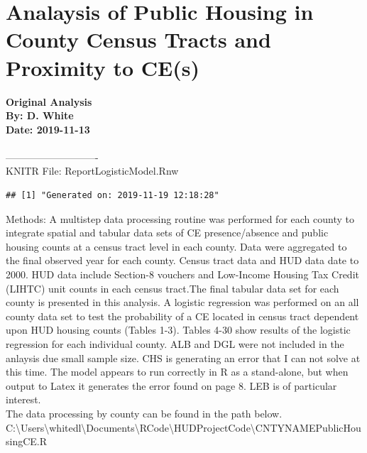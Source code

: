\documentclass{article}\usepackage[]{graphicx}\usepackage[]{color}
\makeatletter
\newenvironment{kframe}{%
 \def\at@end@of@kframe{}%
 \ifinner\ifhmode%
  \def\at@end@of@kframe{\end{minipage}}%
  \begin{minipage}{\columnwidth}%
 \fi\fi%
 \def\FrameCommand##1{\hskip\@totalleftmargin \hskip-\fboxsep
 \colorbox{shadecolor}{##1}\hskip-\fboxsep
     \hskip-\linewidth \hskip-\@totalleftmargin \hskip\columnwidth}%
 \MakeFramed {\advance\hsize-\width
   \@totalleftmargin\z@ \linewidth\hsize
   \@setminipage}}%
 {\par\unskip\endMakeFramed%
 \at@end@of@kframe}
\newenvironment{knitrout}{}{} %
\makeatother
\begin{document}
\section*{Analaysis of Public Housing in County Census Tracts and \\Proximity to CE(s)}

\textbf{Original Analysis}\\
\textbf{By: D. White}\\
\textbf{Date: 2019-11-13}\\
\\
----------------------------\\
\break
KNITR File: Report\textunderscore Logistic\textunderscore Model.Rnw \\
\begin{knitrout}
\color{fgcolor}\begin{kframe}
\begin{verbatim}
## [1] "Generated on: 2019-11-19 12:18:28"
\end{verbatim}
\end{kframe}
\end{knitrout}
  





Methods: A multistep data processing routine was performed for each county to integrate spatial and tabular data sets of CE presence/absence and public housing counts at a census tract level in each county. Data were aggregated to the final observed year for each county. Census tract data and HUD data date to 2000. HUD data include Section-8 vouchers and Low-Income Housing Tax Credit (LIHTC) unit counts in each census tract.The final tabular data set for each county is presented in this analysis. A logistic regression was performed on an all county data set to test the probability of a CE located in census tract dependent upon HUD housing counts (Tables 1-3). Tables 4-30 show results of the logistic regression for each individual county. ALB and DGL were not included in the anlaysis due small sample size. CHS is generating an error that I can not solve at this time. The model appears to run correctly in R as a stand-alone, but when output to Latex it generates the error found on page 8. LEB is of particular interest. \\ 

The data processing by county can be found in the path below.\\ 
C:\textbackslash Users\textbackslash whitedl\textbackslash Documents\textbackslash R\textunderscore Code\textbackslash HUD\textunderscore Project\textunderscore Code\textbackslash CNTYNAME\textunderscore Public\textunderscore Housing\textunderscore CE.R\\
\end{document}
